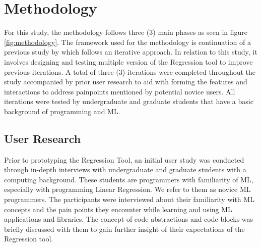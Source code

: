 \documentclass{sigchi-ext}
\begin{document}
\section{Methodology}
For this study, the methodology follows three (3) main phases as seen in figure \ref{fig:methodology}. The framework used for the methodology is continuation of a previous study by \cite{nodalo2019building} which follows an iterative approach. In relation to this study, it involves designing and testing multiple version of the Regression tool to improve previous iterations. A total of three (3) iterations were completed throughout the study accompanied by prior user research to aid with forming the features and interactions to address painpoints mentioned by potential novice users. All iterations were tested by undergraduate and graduate students that have a basic background of programming and ML. 
\subsection{User Research}
Prior to prototyping the Regression Tool, an initial user study was conducted through in-depth interviews with undergraduate and graduate students with a computing background. These students are programmers with familiarity of ML, especially with programming Linear Regression. We refer to them as novice ML programmers. The participants were interviewed about their familiarity with ML concepts and the pain points they encounter while learning and using ML applications and libraries. The concept of code abstractions and code-blocks was briefly discussed with them to gain further insight of their expectations of the Regression tool. 
\end{document}
